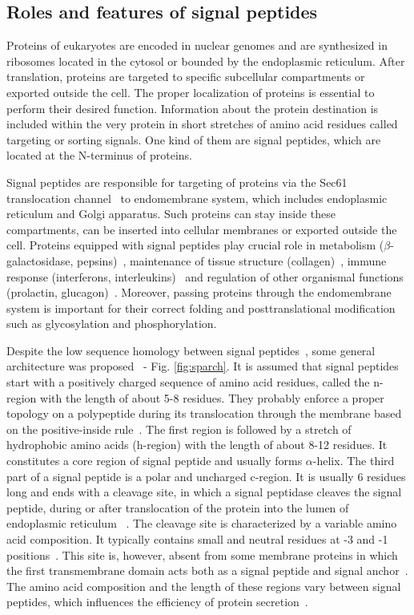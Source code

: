 \documentclass[10pt,letterpaper]{article}
\begin{document}
\subsection*{Roles and features of signal peptides}

Proteins of eukaryotes are encoded in nuclear genomes and are synthesized in ribosomes located in the cytosol or bounded by the endoplasmic reticulum. After translation, proteins are targeted to specific subcellular compartments or exported outside the cell. The proper localization of proteins is essential to perform their desired function. Information about the protein destination is included within the very protein in short stretches of amino acid residues called targeting or sorting signals. One kind of them are signal peptides, which are located at the N-terminus of proteins.

Signal peptides are responsible for targeting of proteins via the Sec61 translocation channel~\cite{2007rapoportprotein} to endomembrane system, which includes endoplasmic reticulum and Golgi apparatus. Such proteins can stay inside these compartments, can be inserted into cellular membranes or exported outside the cell. Proteins equipped with signal peptides play crucial role in metabolism ($\beta$-galactosidase, pepsins)~\cite{1991hofmannmutations}, maintenance of tissue structure (collagen)~\cite{2001chanaberrant}, immune response (interferons, interleukins)~\cite{2005zhangalteration} and regulation of other organismal functions (prolactin, glucagon)~\cite{2010huangrole}. Moreover, passing proteins through the endomembrane system is important for their correct folding and posttranslational modification such as glycosylation and phosphorylation.

Despite the low sequence homology between signal peptides~\cite{1999ladungaphysean}, some general architecture was proposed~\cite{1994izardsignal, 2013vossmechanism} - Fig. \ref{fig:sparch}. It is assumed that signal peptides start with a positively charged sequence of amino acid residues, called the n-region with the length of about 5-8 residues. They probably enforce a proper topology on a polypeptide during its translocation through the membrane based on the positive-inside rule~\cite{1988vonheijnetopogenic}. The first region is followed by a stretch of hydrophobic amino acids (h-region) with the length of about 8-12 residues. It constitutes a core region of signal peptide and usually forms $\alpha$-helix. The third part of a signal peptide is a polar and uncharged c-region. It is usually 6 residues long and ends with a cleavage site, in which a signal peptidase cleaves the signal peptide, during or after translocation of the protein into the lumen of endoplasmic reticulum ~\cite{2002paetzelsignal}. The cleavage site is characterized by a variable amino acid composition. It typically contains small and neutral residues at -3 and -1 positions~\cite{1994palzkillselection}. This site is, however, absent from some membrane proteins in which the first transmembrane domain acts both as a signal peptide and signal anchor~\cite{1988szczesnaskorupapositive}. The amino acid composition and the length of these regions vary between signal peptides, which influences the efficiency of protein secretion~\cite{2006hegdethe}.
\end{document}
